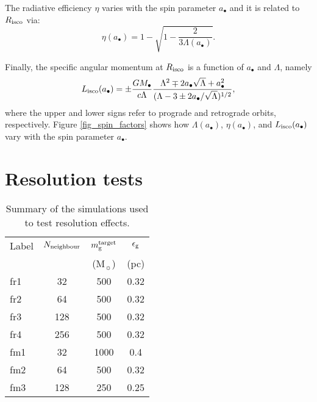 \documentclass[a4paper,fleqn,usenatbib]{mnras}
\begin{document}
The radiative efficiency $\eta$ varies with the spin parameter $a_{\bullet}$ and it is related to $R_{\rm isco}$ via:
\begin{equation}
\eta(a_{\bullet}) = 1 - \sqrt{1 - \frac{2}{3 \Lambda(a_{\bullet})}}.
\end{equation}

Finally, the specific angular momentum at $R_{\rm isco}$ is a function of $a_{\bullet}$ and $\Lambda$, namely
\begin{equation}
L_{\rm isco}(a_{\bullet}) = \pm \frac{G M_{\bullet}}{c \Lambda} \frac{\Lambda^2 \mp 2 a_{\bullet} \sqrt{\Lambda} + a_{\bullet}^2}{(\Lambda - 3 \pm 2 a_{\bullet} / \sqrt{\Lambda})^{1/2}},
\end{equation}
where the upper and lower signs refer to prograde and retrograde orbits, respectively.
Figure \ref{fig_spin_factors} shows how $\Lambda(a_{\bullet})$, $\eta(a_{\bullet})$, and $L_{\rm isco}(a_{\bullet})$ vary with the spin parameter $a_{\bullet}$.


\section{Resolution tests}\label{appendix_restest}

\begin{table}
\caption{Summary of the simulations used to test resolution effects.}
\label{tab_res_runs}
\begin{tabular}{lccc}
\hline
Label & $N_{\rm neighbour}$ & $m_{\rm g}^{\rm target}$ & $\epsilon_{\rm g}$ \\
 & & (M$_{\sun}$) & (pc) \\
\hline
fr1 & 32 & 500 & 0.32 \\
fr2 & 64 & 500 & 0.32  \\
fr3 & 128 & 500 & 0.32  \\
fr4 & 256 & 500 & 0.32  \\
\hline
fm1 & 32 & 1000 & 0.4 \\
fm2 & 64 & 500 & 0.32 \\
fm3 & 128 & 250 & 0.25 \\
\hline
\end{tabular}
\flushleft
\end{table}
\end{document}
